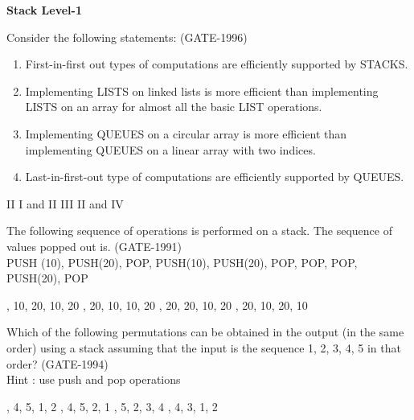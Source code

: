 \centerline{\textbf{ \LARGE Stack Level-1}}

\begin{questyle}
  \question  Consider the following statements:  (GATE-1996)
    \begin{enumerate}
        \item First-in-first out types of computations are efficiently supported by STACKS.
        \item Implementing LISTS on linked lists is more efficient than implementing LISTS on an array for almost all the basic LIST operations.
        \item Implementing QUEUES on a circular array is more efficient than implementing QUEUES on a linear array with two indices.
        \item Last-in-first-out type of computations are efficiently supported by QUEUES.
    \end{enumerate}

  \begin{oneparchoices}
    \choice         II
    \choice         I and II
    \CorrectChoice  III
    \choice         II and IV
  \end{oneparchoices}
\end{questyle}

\begin{questyle}
  \question  The following sequence of operations is performed on a stack. The sequence of values popped out is.  (GATE-1991) \\
             PUSH (10),  PUSH(20),  POP,  PUSH(10),  PUSH(20),  POP,  POP,  POP,  PUSH(20),  POP

  \begin{choices}
    , 10, 20, 10, 20
    , 20, 10, 10, 20
    , 20, 20, 10, 20
    , 20, 10, 20, 10
  \end{choices}
\end{questyle}


\begin{questyle}
  \question  Which of the following permutations can be obtained in the output (in the same order) using a stack assuming
            that the input is the sequence 1, 2, 3, 4, 5 in that order?  (GATE-1994) \\ Hint : use push and pop operations

  \begin{choices}
    , 4, 5, 1, 2
    , 4, 5, 2, 1
    , 5, 2, 3, 4
    , 4, 3, 1, 2
  \end{choices}
\end{questyle}

